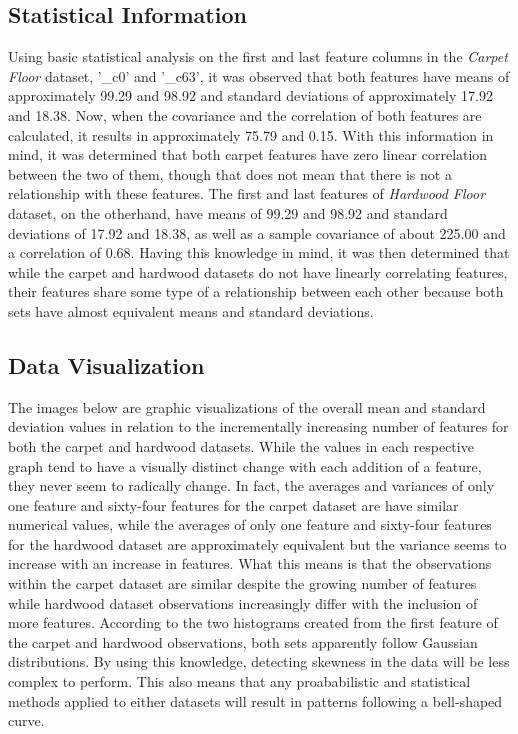 \documentclass[a4paper,12pt]{IEEEtran}
\begin{document}
\subsection{Statistical Information}
\label{sec1}
Using basic statistical analysis on the first and last feature columns in the \textit{Carpet Floor} dataset, '\_c0' and '\_c63', it was observed that both features have means of approximately 99.29 and 98.92 and standard deviations of approximately 17.92 and 18.38. Now, when the covariance and the correlation of both features are calculated, it results in approximately 75.79 and 0.15. With this information in mind, it was determined that both carpet features have zero linear correlation between the two of them, though that does not mean that there is not a relationship with these features. The first and last features of \textit{Hardwood Floor} dataset, on the otherhand, have means of 99.29 and 98.92 and standard deviations of 17.92 and 18.38, as well as a sample covariance of about 225.00 and a correlation of 0.68. Having this knowledge in mind, it was then determined that while the carpet and hardwood datasets do not have linearly correlating features, their features share some type of a relationship between each other because both sets have almost equivalent means and standard deviations.

\subsection{Data Visualization}
\label{sec2}
The images below are graphic visualizations of the overall mean and standard deviation values in relation to the incrementally increasing number of features for both the carpet and hardwood datasets. While the values in each respective graph tend to have a visually distinct change with each addition of a feature, they never seem to radically change. In fact, the averages and variances of only one feature and sixty-four features for the carpet dataset are have similar numerical values, while the averages of only one feature and sixty-four features for the hardwood dataset are approximately equivalent but the variance seems to increase with an increase in features. What this means is that the observations within the carpet dataset are similar despite the growing number of features while hardwood dataset observations increasingly differ with the inclusion of more features.
According to the two histograms created from the first feature of the carpet and hardwood observations, both sets apparently follow Gaussian distributions. By using this knowledge, detecting skewness in the data will be less complex to perform. This also means that any proababilistic and statistical methods applied to either datasets will result in patterns following a bell-shaped curve.
\end{document}
